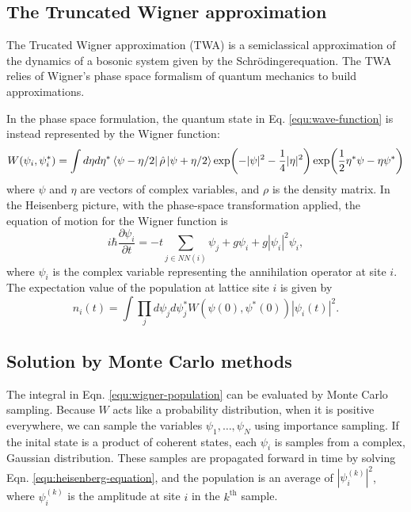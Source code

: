 \documentclass{article}
\newcommand{\Schroedinger}{Schr{\"o}dinger}
\begin{document}
\subsection{The Truncated Wigner approximation}

The Trucated Wigner approximation (TWA) is a semiclassical approximation of the dynamics of a bosonic system 
given by the \Schroedinger equation. The TWA relies of Wigner's phase space formalism of quantum mechanics to 
build approximations. 

In the phase space formulation, the quantum state in Eq. \ref{equ:wave-function} is instead represented by the 
Wigner function:
\begin{equation}
    \label{equ:wigner-function}
    W(\psi_i, \psi^\ast_i) = \int d\eta d\eta^\ast \bra{\psi - \eta/2} \hat{\rho} \ket{\psi + \eta/2} 
    \exp(-|\psi|^2 - \frac{1}{4}|\eta|^2) \exp(\frac{1}{2} \eta^\ast \psi - \eta \psi^\ast)
\end{equation}
where \(\psi\) and \(\eta\) are vectors of complex variables, and \(\rho\) is the density matrix. 
In the Heisenberg picture, with the phase-space transformation applied, 
the equation of motion for the Wigner function is 
\begin{equation}
    \label{equ:heisenberg-equation}
    i \hbar \frac{\partial \psi_i}{\partial t} = 
    -t\sum_{j \in NN(i)} \psi_j + g \psi_i + g |\psi_i|^2 \psi_i ,
\end{equation}
where \(\psi_i\) is the complex variable representing the annihilation operator at site \(i\).
The expectation value of the population at lattice site \(i\) is given by 
\begin{equation}
    \label{equ:wigner-population}
    n_i(t) = \int \prod_j d\psi_j d\psi_j^\ast W(\psi(0), \psi^\ast(0)) |\psi_i (t)|^2.
\end{equation}

\subsection{Solution by Monte Carlo methods}

The integral in Eqn. \ref{equ:wigner-population} can be evaluated by Monte Carlo sampling. 
Because \(W\) acts like a probability distribution, when it is positive everywhere, we can sample 
the variables \(\psi_1, \ldots, \psi_N\) using importance sampling. If the inital state is a product of 
coherent states, each \(\psi_i\) is samples from a complex, Gaussian distribution. These samples are 
propagated forward in time by solving Eqn. \ref{equ:heisenberg-equation}, and the population is an average of 
\(|\psi_i^{(k)}|^2\), where \(\psi_i^{(k)}\) is the amplitude at site \(i\) in the \(k^\textrm{th}\) sample.
\end{document}
